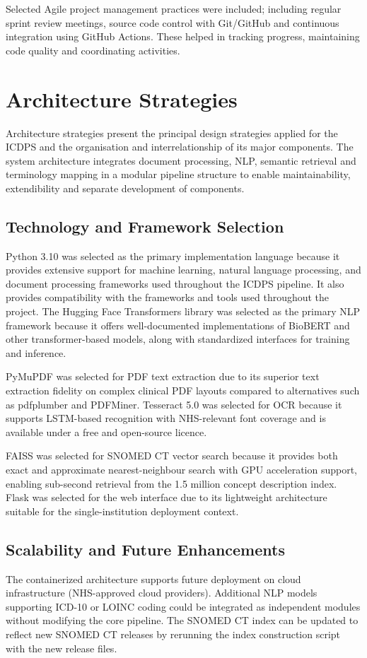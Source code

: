 Selected Agile project management practices were included; including regular sprint review meetings, source code control with Git/GitHub and continuous integration using GitHub Actions. These helped in tracking progress, maintaining code quality and coordinating activities.

\section{Architecture Strategies}

Architecture strategies present the principal design strategies applied for the ICDPS and the organisation and interrelationship of its major components. The system architecture integrates document processing, NLP, semantic retrieval and terminology mapping in a modular pipeline structure to enable maintainability, extendibility and separate development of components.

\subsection{Technology and Framework Selection}
Python 3.10 was selected as the primary implementation language because it provides extensive support for machine learning, natural language processing, and document processing frameworks used throughout the ICDPS pipeline. It also provides compatibility with the frameworks and tools used throughout the project. The Hugging Face Transformers library was selected as the primary NLP framework because it offers well-documented implementations of BioBERT and other transformer-based models, along with standardized interfaces for training and inference.

PyMuPDF was selected for PDF text extraction due to its superior text extraction fidelity on complex clinical PDF layouts compared to alternatives such as pdfplumber and PDFMiner. Tesseract 5.0 was selected for OCR because it supports LSTM-based recognition with NHS-relevant font coverage and is available under a free and open-source licence.

FAISS was selected for SNOMED CT vector search because it provides both exact and approximate nearest-neighbour search with GPU acceleration support, enabling sub-second retrieval from the 1.5 million concept description index. Flask was selected for the web interface due to its lightweight architecture suitable for the single-institution deployment context.

\subsection{Scalability and Future Enhancements}
The containerized architecture supports future deployment on cloud infrastructure (NHS-approved cloud providers). Additional NLP models supporting ICD-10 or LOINC coding could be integrated as independent modules without modifying the core pipeline. The SNOMED CT index can be updated to reflect new SNOMED CT releases by rerunning the index construction script with the new release files.

